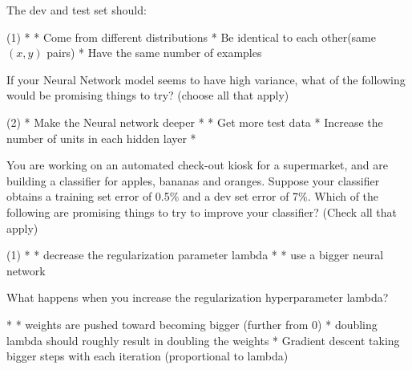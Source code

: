 \documentclass[10pt]{extarticle}
\begin{document}
\begin{exercise}
    The dev and test set should:
    \begin{choice}(1)
        * 
        * Come from different distributions
        * Be identical to each other(same \((x,y)\) pairs)
        * Have the same number of examples
    \end{choice}
\end{exercise}
\begin{solution}
\end{solution}

\begin{exercise}
    If your Neural Network model seems to have high variance, what of the following would be promising things to try? (choose all that apply)
    \begin{choice} (2)
        * Make the Neural network deeper
        * 
        * Get more test data
        * Increase the number of units in each hidden layer
        * 
    \end{choice}
\end{exercise}
\begin{solution}
\end{solution}

\begin{exercise}
    You are working on an automated check-out kiosk for a supermarket, and are building a classifier for apples, bananas and oranges. Suppose your classifier obtains a training set error of 0.5\% and a dev set error of 7\%. Which of the following are promising things to try to improve your classifier? (Check all that apply)
    \begin{choice}(1)
        * 
        * decrease the regularization parameter lambda
        * 
        * use a bigger neural network
    \end{choice}
\end{exercise}
\begin{solution}
\end{solution}

\begin{exercise}
    What happens when you increase the regularization hyperparameter lambda?
    \begin{choice}
        * 
        * weights are pushed toward becoming bigger (further from 0)
        * doubling lambda should roughly result in doubling the weights
        * Gradient descent taking bigger steps with each iteration (proportional to lambda)
    \end{choice}
\end{exercise}
\begin{solution}
\end{solution}
\end{document}
